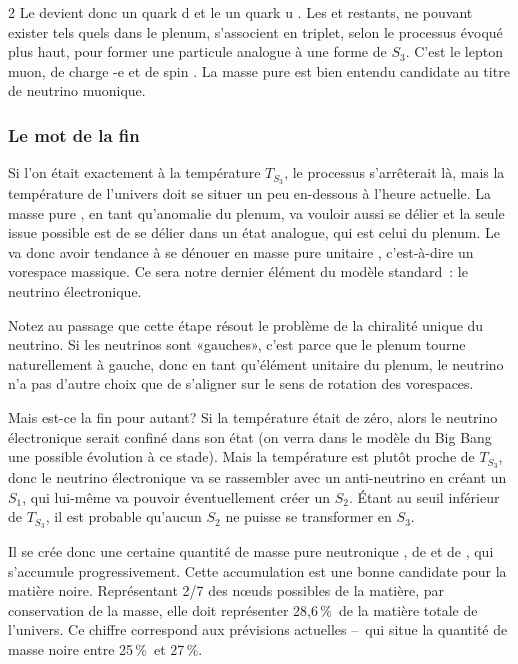 \begin{multicols}{2}
Le  devient donc un quark d  et le  un quark u . Les
 et  restants, ne pouvant exister tels quels dans
le plenum, s'associent en triplet, selon le processus évoqué plus
haut, pour former une particule analogue à une forme de $S_3$. C'est le
lepton muon, de charge -e et de spin . La masse pure  est
bien entendu candidate au titre de neutrino muonique.

\subsubsection{Le mot de la fin}

Si l'on était exactement à la température $T_{S_3}$, le processus s'arrêterait
là, mais la température de l'univers doit se situer un peu en-dessous
à l'heure actuelle. La masse pure , en tant qu'anomalie du
plenum, va vouloir aussi se délier et la seule issue possible est de
se délier dans un état analogue, qui est celui du plenum. Le 
va donc avoir tendance à se dénouer en masse pure unitaire ,
c'est-à-dire un vorespace massique. Ce sera notre dernier élément du
modèle standard : le neutrino électronique.

Notez au passage que cette étape résout le problème de la chiralité
unique du neutrino. Si les neutrinos sont «gauches», c'est parce que
le plenum tourne naturellement à gauche, donc en tant qu'élément
unitaire du plenum, le neutrino n'a pas d'autre choix que de s'aligner
sur le sens de rotation des vorespaces.

Mais est-ce la fin pour autant? Si la température était de zéro,
alors le neutrino électronique serait confiné dans son état (on verra
dans le modèle du Big Bang une possible évolution à ce stade). Mais la
température est plutôt proche de $T_{S_3}$, donc le neutrino électronique
va se rassembler avec un anti-neutrino en créant un $S_1$, qui lui-même
va pouvoir éventuellement créer un $S_2$. Étant au seuil inférieur de
$T_{S_3}$, il est probable qu'aucun $S_2$ ne puisse se transformer en $S_3$.

Il se crée donc une certaine quantité de masse pure neutronique , de
 et de , qui s'accumule progressivement. Cette
accumulation est une bonne candidate pour la matière noire. Représentant
2/7 des nœuds possibles de la matière, par conservation de la masse,
elle doit représenter 28,6\,\%\ de la matière totale de l'univers. Ce
chiffre correspond aux prévisions actuelles --~qui situe la quantité de masse noire
entre 25\,\%\ et 27\,\%.


\end{multicols}
